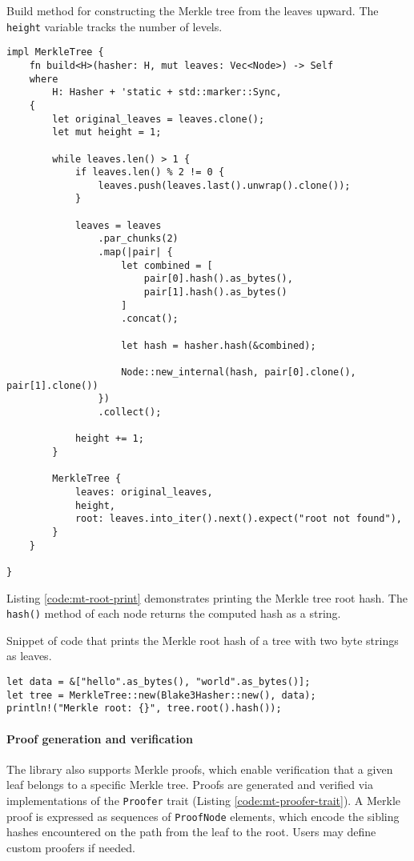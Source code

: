 \begin{listing}[H]
\caption{Build method for constructing the Merkle tree from the leaves upward. The \texttt{height} variable tracks the number of levels.}
\label{code:mt-build}
\begin{verbatim}
impl MerkleTree {
    fn build<H>(hasher: H, mut leaves: Vec<Node>) -> Self
    where
        H: Hasher + 'static + std::marker::Sync,
    {
        let original_leaves = leaves.clone();
        let mut height = 1;

        while leaves.len() > 1 {
            if leaves.len() % 2 != 0 {
                leaves.push(leaves.last().unwrap().clone());
            }

            leaves = leaves
                .par_chunks(2)
                .map(|pair| {
                    let combined = [
                        pair[0].hash().as_bytes(),
                        pair[1].hash().as_bytes()
                    ]
                    .concat();
                    
                    let hash = hasher.hash(&combined);
                    
                    Node::new_internal(hash, pair[0].clone(), pair[1].clone())
                })
                .collect();

            height += 1;
        }

        MerkleTree {
            leaves: original_leaves,
            height,
            root: leaves.into_iter().next().expect("root not found"),
        }
    }

}
\end{verbatim}
\end{listing}

Listing \ref{code:mt-root-print} demonstrates printing the Merkle tree root hash. The \texttt{hash()} method of each node returns the computed hash as a string.
\begin{listing}[H]
\caption{Snippet of code that prints the Merkle root hash of a tree with two byte strings as leaves.}
\label{code:mt-root-print}
\begin{verbatim}
let data = &["hello".as_bytes(), "world".as_bytes()];
let tree = MerkleTree::new(Blake3Hasher::new(), data);
println!("Merkle root: {}", tree.root().hash());
\end{verbatim}
\end{listing}

\paragraph{Proof generation and verification}
The library also supports Merkle proofs, which enable verification that a given leaf belongs to a specific Merkle tree. Proofs are generated and verified via implementations of the \texttt{Proofer} trait (Listing \ref{code:mt-proofer-trait}). A Merkle proof is expressed as sequences of \texttt{ProofNode} elements, which encode the sibling hashes encountered on the path from the leaf to the root. Users may define custom proofers if needed.


